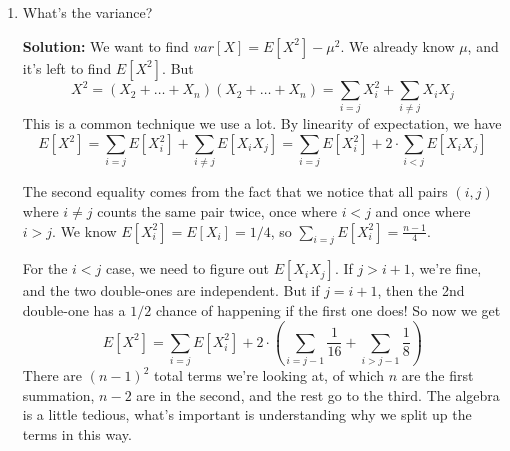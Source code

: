 \documentclass{article}
\newenvironment{solution}{

            \color{blue} \smallskip \textbf{Solution:}}{}
\begin{document}
\begin{enumerate}
\begin{enumerate}
\begin{solution}
                \end{solution}
                \item What's the variance?
                \begin{solution}
                    We want to find $var[X] = E[X^2] - \mu^2$. We already know $\mu$, and it's left to find $E[X^2]$. But \[
                        X^2 = (X_2 + \ldots + X_n) (X_2 + \ldots + X_n) = \sum_{i = j} X_i^2 + \sum_{i \neq j} X_i X_j
                    \]
                    This is a common technique we use a lot. By linearity of expectation, we have \[
                        E[X^2] = \sum_{i = j} E[X_i^2] + \sum_{i \neq j} E[X_i X_j] = \sum_{i = j} E[X_i^2] + 2 \cdot \sum_{i < j} E[X_i X_j]
                    \]
                    
                    The second equality comes from the fact that we notice that all pairs $(i, j)$ where $i \neq j$ counts the same pair twice, once where $i < j$
                    and once where $i > j$.
                    We know $E[X_i^2] = E[X_i] = 1/4$, so $\sum_{i = j} E[X_i^2] = \frac{n-1}{4}$.

                    For the $i < j$ case, we need to figure out $E[X_i X_j]$. If $j > i + 1$, we're fine, and the two double-ones are independent. But if $j = i + 1$, then the 2nd double-one
                    has a $1/2$ chance of happening if the first one does! So now we get \[
                        E[X^2] =  \sum_{i = j} E[X_i^2] + 2 \cdot \left(\sum_{i = j - 1} \frac{1}{16} + \sum_{i > j - 1} \frac{1}{8}\right)
                    \]
                    There are $(n-1)^2$ total terms we're looking at, of which $n$ are the first summation, $n-2$ are in the second, and the rest go to the third. The algebra is a little tedious, what's
                    important is understanding why we split up the terms in this way.
                \end{solution}
            \end{enumerate}
    \end{enumerate}
    
\end{document}
